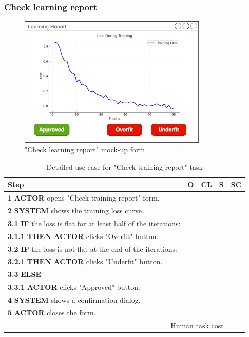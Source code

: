 \subsubsection{Check learning report}

\begin{figure}[H]
\centering
\includegraphics[width=0.8\textwidth]{figures/check_learning_report.png}
\caption{"Check learning report" mock-up form}
\end{figure}

\begin{table}[H]
\centering
\begin{tabularx}{\textwidth}{|X|c|c|c|c|}
\hline
\textbf{Step} & \textbf{O} & \textbf{CL} & \textbf{S} & \textbf{SC} \\
\hline
\textbf{1} \textbf{ACTOR} opens "Check training report" form. & & & & \\
\hline
\textbf{2} \textbf{SYSTEM} shows the training loss curve. & & & & \\
\hline
\textbf{3.1} \textbf{IF} the loss is flat for at least half of the iterations: & & & & \\
\hline
\textbf{3.1.1} \textbf{THEN} \textbf{ACTOR} clicks "Overfit" button. & & & & \\
\hline
\textbf{3.2} \textbf{IF} the loss is not flat at the end of the iterations: & & & & \\
\hline
\textbf{3.2.1} \textbf{THEN} \textbf{ACTOR} clicks "Underfit" button. & & & & \\
\hline
\textbf{3.3} \textbf{ELSE} & & & & \\
\hline
\textbf{3.3.1} \textbf{ACTOR} clicks "Approved" button. & & & & \\
\hline
\textbf{4} \textbf{SYSTEM} shows a confirmation dialog. & & & & \\
\hline
\textbf{5} \textbf{ACTOR} closes the form. & & & & \\
\hline
\multicolumn{4}{|r|}{Human task cost} & \\
\hline
\end{tabularx}
\caption{Detailed use case for "Check training report" task}
\label{table:check_training_report}
\end{table}


